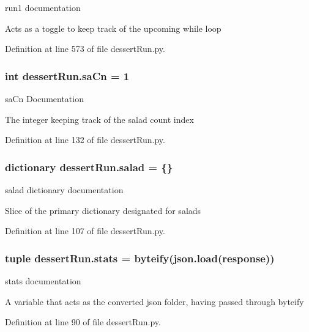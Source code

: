 run1 documentation 

Acts as a toggle to keep track of the upcoming while loop 

Definition at line 573 of file dessert\-Run.\-py.

\hypertarget{namespacedessertRun_a6f524dca59e264915b76d82b8381dfa3}{
\subsubsection[{sa\-Cn}]{\setlength{\rightskip}{0pt plus 5cm}int dessert\-Run.\-sa\-Cn = 1}}\label{namespacedessertRun_a6f524dca59e264915b76d82b8381dfa3}


sa\-Cn Documentation 

The integer keeping track of the salad count index 

Definition at line 132 of file dessert\-Run.\-py.

\hypertarget{namespacedessertRun_ac06bb6058314a8f010e0c2a6d3a6c067}{
\subsubsection[{salad}]{\setlength{\rightskip}{0pt plus 5cm}dictionary dessert\-Run.\-salad = \{\}}}\label{namespacedessertRun_ac06bb6058314a8f010e0c2a6d3a6c067}


salad dictionary documentation 

Slice of the primary dictionary designated for salads 

Definition at line 107 of file dessert\-Run.\-py.

\hypertarget{namespacedessertRun_a6711acc9ba277e4a4d250a01bf76ef22}{
\subsubsection[{stats}]{\setlength{\rightskip}{0pt plus 5cm}tuple dessert\-Run.\-stats = {\bf byteify}(json.\-load({\bf response}))}}\label{namespacedessertRun_a6711acc9ba277e4a4d250a01bf76ef22}


stats documentation 

A variable that acts as the converted json folder, having passed through byteify 

Definition at line 90 of file dessert\-Run.\-py.

